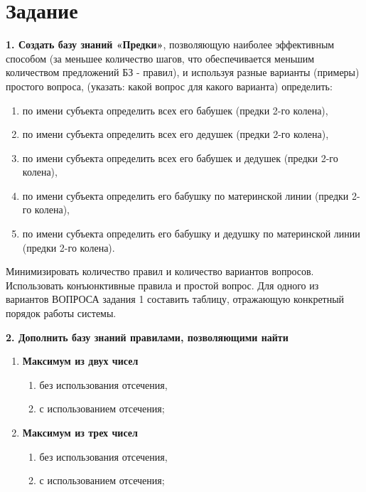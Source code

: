 \section{Задание}

\footnotesize
\textbf{1. Создать базу знаний «Предки»}, позволяющую наиболее эффективным способом (за меньшее количество шагов, что обеспечивается меньшим количеством предложений БЗ - правил), и используя разные варианты (примеры) простого вопроса, (указать: какой вопрос для какого варианта) определить:

\begin{enumerate}[label=\arabic*., itemsep=0pt, parsep=0pt]
	\item по имени субъекта определить всех его бабушек (предки 2-го колена),
	\item по имени субъекта определить всех его дедушек (предки 2-го колена),
	\item по имени субъекта определить всех его бабушек и дедушек (предки 2-го колена),
	\item по имени субъекта определить его бабушку по материнской линии (предки 2-го колена),
	\item по имени субъекта определить его бабушку и дедушку по материнской линии (предки 2-го колена).
\end{enumerate}

Минимизировать количество правил и количество вариантов вопросов. Использовать конъюнктивные правила и простой вопрос. Для одного из вариантов ВОПРОСА задания 1 составить таблицу, отражающую конкретный порядок работы системы.

\textbf{2. Дополнить базу знаний правилами, позволяющими найти}

\begin{enumerate}[label=\arabic*., itemsep=0pt, parsep=0pt]
	\item \textbf{Максимум из двух чисел}
	      \begin{enumerate}[label=\alph*), ref=\alph*, itemsep=0pt, parsep=0pt]
		      \item без использования отсечения,
		      \item с использованием отсечения;
	      \end{enumerate}
	\item \textbf{Максимум из трех чисел}
	      \begin{enumerate}[label=\alph*), ref=\alph*, itemsep=0pt, parsep=0pt]
		      \item без использования отсечения,
		      \item с использованием отсечения;
	      \end{enumerate}
\end{enumerate}

